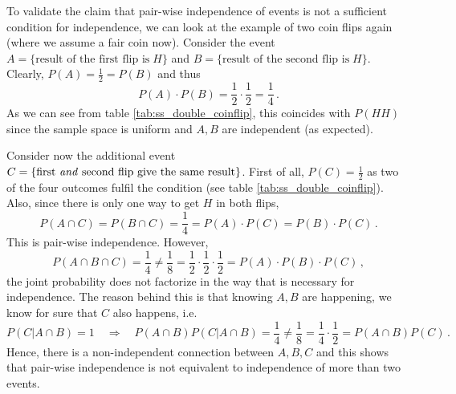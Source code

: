 \begin{ex}
To validate the claim that pair-wise independence of events is not a sufficient condition for independence, we can look at the example of two coin flips again (where we assume a fair coin now). Consider the event $A = \{\text{result of the first flip is} \; H\}$ and $B = \{\text{result of the second flip is} \; H\}$. Clearly, $P(A) = \frac{1}{2} = P(B)$ and thus
\begin{equation*}
P(A) \cdot P(B) = \frac{1}{2} \cdot \frac{1}{2} = \frac{1}{4} \, .
\end{equation*}
As we can see from table \ref{tab:ss_double_coinflip}, this coincides with $P(HH)$ since the sample space is uniform and $A, B$ are independent (as expected).

Consider now the additional event $C = \{\text{first \emph{and} second flip give the same result}\}$. First of all, $P(C) = \frac{1}{2}$ as two of the four outcomes fulfil the condition (see table \ref{tab:ss_double_coinflip}). Also, since there is only one way to get $H$ in both flips,
\begin{equation*}
P(A \cap C) = P(B \cap C) = \frac{1}{4} = P(A) \cdot P(C) = P(B) \cdot P(C) \, .
\end{equation*}
This is pair-wise independence. However,
\begin{equation*}
P(A \cap B \cap C) = \frac{1}{4} \neq \frac{1}{8} = \frac{1}{2} \cdot \frac{1}{2} \cdot \frac{1}{2} = P(A) \cdot P(B) \cdot P(C) \, ,
\end{equation*}
the joint probability does not factorize in the way that is necessary for independence. The reason behind this is that knowing $A, B$ are happening, we know for sure that $C$ also happens, i.e.
\begin{equation*}
P(C | A \cap B) = 1 \quad \Rightarrow \quad P(A \cap B) P(C | A \cap B) = \frac{1}{4} \neq \frac{1}{8} = \frac{1}{4} \cdot \frac{1}{2} =  P(A \cap B) P(C) \, .
\end{equation*}
Hence, there is a non-independent connection between $A, B, C$ and this shows that pair-wise independence is not equivalent to independence of more than two events.
\end{ex}



